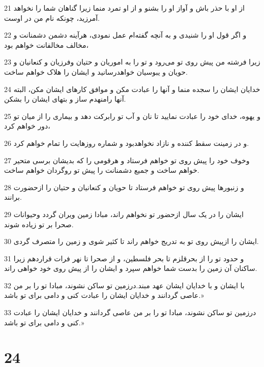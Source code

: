 \par 21 از او با حذر باش و آواز او را بشنو و از او تمرد منما زیرا گناهان شما را نخواهد آمرزید، چونکه نام من در اوست.
\par 22 و اگر قول او را شنیدی و به آنچه گفته‌ام عمل نمودی، هرآینه دشمن دشمنانت و مخالف مخالفانت خواهم بود،
\par 23 زیرا فرشته من پیش روی تو می‌رود و تو را به اموریان و حتیان وفرزیان و کنعانیان و حویان و یبوسیان خواهدرسانید و ایشان را هلاک خواهم ساخت.
\par 24 خدایان ایشان را سجده منما و آنها را عبادت مکن و موافق کارهای ایشان مکن، البته آنها رامنهدم ساز و بتهای ایشان را بشکن.
\par 25 و یهوه، خدای خود را عبادت نمایید تا نان و آب تو رابرکت دهد و بیماری را از میان تو دور خواهم کرد،
\par 26 و در زمینت سقط کننده و نازاد نخواهدبود و شماره روزهایت را تمام خواهم کرد.
\par 27 وخوف خود را پیش روی تو خواهم فرستاد و هرقومی را که بدیشان برسی متحیر خواهم ساخت و جمیع دشمنانت را پیش تو روگردان خواهم ساخت.
\par 28 و زنبورها پیش روی تو خواهم فرستاد تا حویان و کنعانیان و حتیان را ازحضورت برانند.
\par 29 ایشان را در یک سال ازحضور تو نخواهم راند، مبادا زمین ویران گردد وحیوانات صحرا بر تو زیاده شوند.
\par 30 ایشان را ازپیش روی تو به تدریج خواهم راند تا کثیر شوی و زمین را متصرف گردی.
\par 31 و حدود تو را از بحرقلزم تا بحر فلسطین، و از صحرا تا نهر فرات قراردهم زیرا ساکنان آن زمین را بدست شما خواهم سپرد و ایشان را از پیش روی خود خواهی راند.
\par 32 با ایشان و با خدایان ایشان عهد مبند.درزمین تو ساکن نشوند، مبادا تو را بر من عاصی گردانند و خدایان ایشان را عبادت کنی و دامی برای تو باشد.»
\par 33 درزمین تو ساکن نشوند، مبادا تو را بر من عاصی گردانند و خدایان ایشان را عبادت کنی و دامی برای تو باشد.»
 
\chapter{24}

